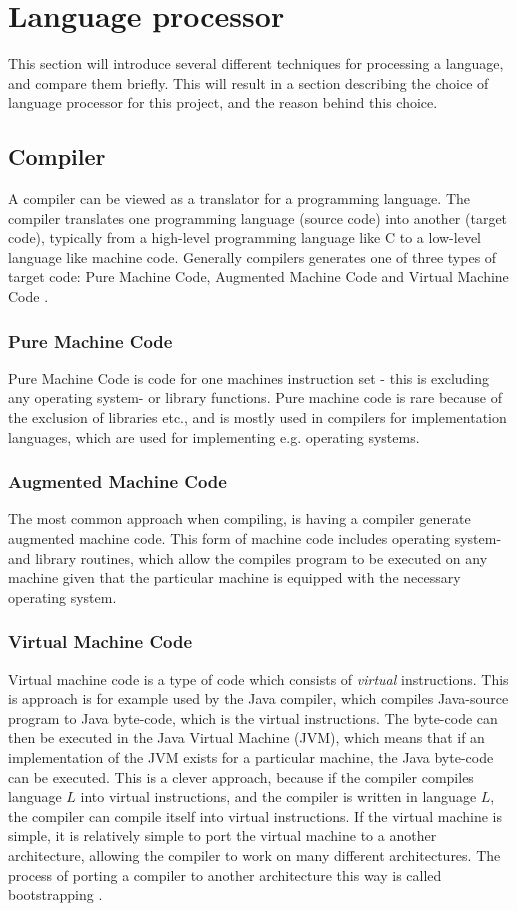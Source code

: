\section{Language processor}
This section will introduce several different techniques for processing a language, and compare them briefly. This will result in a section describing the choice of language processor for this project, and the reason behind this choice.

\subsection{Compiler}
A compiler can be viewed as a translator for a programming language. The compiler translates one programming language (source code) into another (target code), typically from a high-level programming language like C to a low-level language like machine code. Generally compilers generates one of three types of target code: Pure Machine Code, Augmented Machine Code and Virtual Machine Code \citep{CraftingACompiler}.

\subsubsection*{Pure Machine Code} 
Pure Machine Code is code for one machines instruction set - this is excluding any operating system- or library functions. Pure machine code is rare because of the exclusion of libraries etc., and is mostly used in compilers for implementation languages, which are used for implementing e.g. operating systems.
 
\subsubsection*{Augmented Machine Code}
The most common approach when compiling, is having a compiler generate augmented machine code. This form of machine code includes operating system- and library routines, which allow the compiles program to be executed on any machine given that the particular machine is equipped with the necessary operating system.

\subsubsection*{Virtual Machine Code} 
Virtual machine code is a type of code which consists of \emph{virtual} instructions. This is approach is for example used by the Java compiler, which compiles Java-source program to Java byte-code, which is the virtual instructions. The byte-code can then be executed in the Java Virtual Machine (JVM), which means that if an implementation of the JVM exists for a particular machine, the Java byte-code can be executed. This is a clever approach, because if the compiler compiles language $L$ into virtual instructions, and the compiler is written in language $L$, the compiler can compile itself into virtual instructions. If the virtual machine is simple, it is relatively simple to port the virtual machine to a another architecture, allowing the compiler to work on many different architectures. The process of porting a compiler to another architecture this way is called bootstrapping \citep{CraftingACompiler}. 

